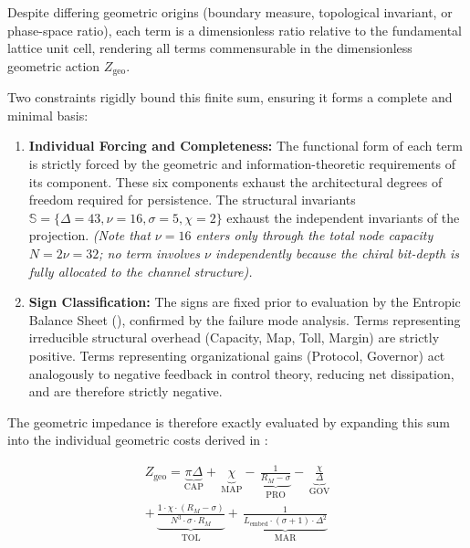 Despite differing geometric origins (boundary measure, topological invariant, or phase-space ratio), each term is a dimensionless ratio relative to the fundamental lattice unit cell, rendering all terms commensurable in the dimensionless geometric action $Z_{\text{geo}}$.

Two constraints rigidly bound this finite sum, ensuring it forms a complete and minimal basis:
\begin{enumerate}
    \item \textbf{Individual Forcing and Completeness:} The functional form of each term is strictly forced by the geometric and information-theoretic requirements of its component. These six components exhaust the architectural degrees of freedom required for persistence. The structural invariants $\mathbb{S} = \{\Delta=43, \nu=16, \sigma=5, \chi=2\}$ exhaust the independent invariants of the projection. \textit{(Note that $\nu=16$ enters only through the total node capacity $N=2\nu=32$; no term involves $\nu$ independently because the chiral bit-depth is fully allocated to the channel structure).}
    
    \item \textbf{Sign Classification:} The signs are fixed prior to evaluation by the Entropic Balance Sheet (), confirmed by the failure mode analysis. Terms representing irreducible structural overhead (Capacity, Map, Toll, Margin) are strictly positive. Terms representing organizational gains (Protocol, Governor) act analogously to negative feedback in control theory, reducing net dissipation, and are therefore strictly negative.
\end{enumerate}

The geometric impedance is therefore exactly evaluated by expanding this sum into the individual geometric costs derived in :

\begin{equation}\label{eq:alpha_inverse}
\begin{split}
Z_{\text{geo}} = \underbrace{\pi\Delta}_{\text{CAP}}
+ \,\underbrace{\chi}_{\text{MAP}}
- \,\underbrace{\frac{1}{R_M - \sigma}}_{\text{PRO}}
- \,\underbrace{\frac{\chi}{\Delta}}_{\text{GOV}} \\
+ \,\underbrace{\frac{1 \cdot \chi \cdot (R_M - \sigma)}{N^3 \cdot \sigma \cdot R_M}}_{\text{TOL}}
+ \,\underbrace{\frac{1}{L_{\text{embed}} \cdot (\sigma + 1) \cdot \Delta^2}}_{\text{MAR}}
\end{split}
\end{equation}


